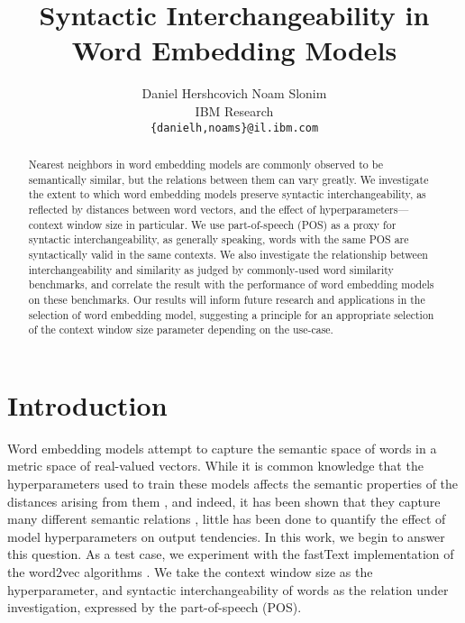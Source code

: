 \documentclass[11pt,a4paper]{article}
\title{Syntactic Interchangeability in Word Embedding Models}
\author{
Daniel Hershcovich \qquad Noam Slonim \\
IBM Research\\
\texttt{\{danielh,noams\}@il.ibm.com}
}
\begin{document}
    \maketitle

    \begin{abstract}
    Nearest neighbors in word embedding models are commonly observed to be
    semantically similar, but the relations between them can vary greatly.
    We investigate the extent to which word embedding models
    preserve syntactic interchangeability, as reflected by distances between
    word vectors, and the effect of hyperparameters---context window size in particular.
    We use part-of-speech (POS) as a proxy for syntactic interchangeability,
    as generally speaking, words with the same POS are syntactically valid in the same contexts.
    We also investigate the relationship between interchangeability
    and similarity as judged by commonly-used word similarity benchmarks,
    and correlate the result with the performance of word embedding models
    on these benchmarks.
    Our results will inform future research and applications in the selection
    of word embedding model, suggesting a principle for an appropriate selection
    of the context window size parameter depending on the use-case.
    \end{abstract}

    \section{Introduction}\label{sec:introduction}

    Word embedding models \cite{mikolov2013efficient,pennington2014glove,levy2015improving}
    attempt to capture the semantic space of words
    in a metric space of real-valued vectors.
    While it is common knowledge that the hyperparameters used to train these
    models affects the semantic properties of the distances arising from them
    \cite{goldberg2016primer}, and indeed, it has been shown that
    they capture many different semantic relations \cite{yang2006verb,agirre2009study},
    little has been done to quantify the
    effect of model hyperparameters on output tendencies.
    In this work, we begin to answer this question.
    As a test case, we experiment with the fastText implementation \cite{bojanowski2016enriching}
    of the word2vec algorithms \cite{mikolov2013efficient}.
    We take the context window size as the hyperparameter,
    and syntactic interchangeability of words as the relation under investigation,
    expressed by the part-of-speech (POS).
    
\end{document}
